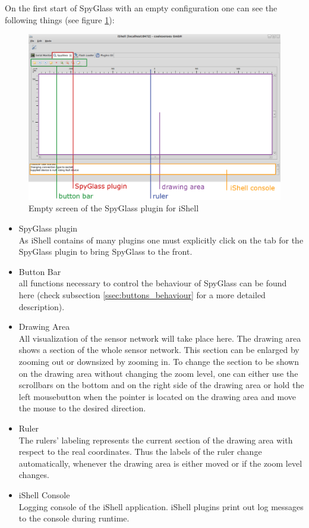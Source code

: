 		On the first start of SpyGlass with an empty configuration one can see the 
		following things (see figure \ref{pic:spyglass_first_appearance}):
		
		\begin{figure}[htb]
			\begin{center}
				\includegraphics[width=13.2cm]{./pics/spyglass_first_appearance}
				\caption{Empty screen of the SpyGlass plugin for iShell}
				\label{pic:spyglass_first_appearance}
			\end{center}
		\end{figure}
		
		\begin{itemize}
			\item SpyGlass plugin\\
				As iShell contains of many plugins one must explicitly click on the tab for 
				the SpyGlass plugin to bring SpyGlass to the front.
			\item Button Bar\\
				all functions necessary to control the behaviour of SpyGlass can be found 
				here (check subsection \ref{ssec:buttons_behaviour} for a more detailed description).
			\item Drawing Area\\
				All visualization of the sensor network will take place here. The drawing 
				area shows a section of the whole sensor network. This section can be 
				enlarged by zooming out or downsized by zooming in. To change the 
				section to be shown on the drawing area without changing the zoom level, 
				one can either use the scrollbars on the bottom and on the right side of 
				the drawing area or hold the left mousebutton when the pointer is located 
				on the drawing area and move the mouse to the desired direction.
			\item Ruler\\
				The rulers’ labeling represents the current section of the drawing area 
				with respect to the real coordinates. Thus the labels of the ruler change 
				automatically, whenever the drawing area is either moved or if the zoom 
				level changes.
			\item iShell Console\\
				Logging console of the iShell application. iShell plugins print out log 
				messages to the console during runtime.
		\end{itemize}
		
